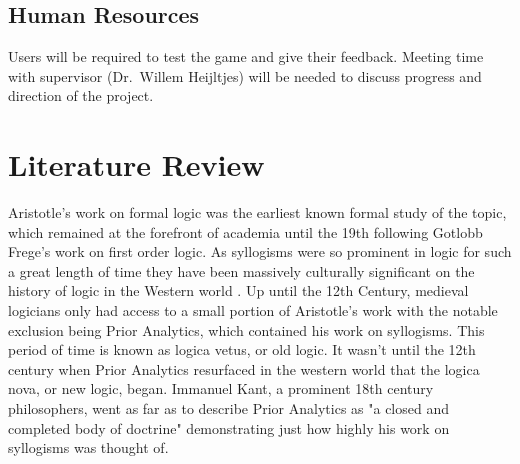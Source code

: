 \documentclass[12pt,a4paper]{report}
\begin{document}
\section{Human Resources}
Users will be required to test the game and give their feedback. 
Meeting time with supervisor (Dr.~Willem Heijltjes) will be needed to discuss progress and direction of the project.


\chapter{Literature Review}


Aristotle's work on formal logic was the earliest known formal study of the topic, which remained at the forefront of academia until the 19th following Gotlobb Frege's work on first order logic. As syllogisms were so prominent in logic for such a great length of time they have been massively culturally significant on the history of logic in the Western world \citep{sep-aristotle-logic}. Up until the 12th Century, medieval logicians only had access to a small portion of Aristotle's work with the notable exclusion being Prior Analytics, which contained his work on syllogisms. This period of time is known as logica vetus, or old logic. It wasn't until the 12th century when Prior Analytics resurfaced in the western world that the logica nova, or new logic, began. Immanuel Kant, a prominent 18th century philosophers, went as far as to describe Prior Analytics as "a closed and completed body of doctrine" demonstrating just how highly his work on syllogisms was thought of.
\end{document}
